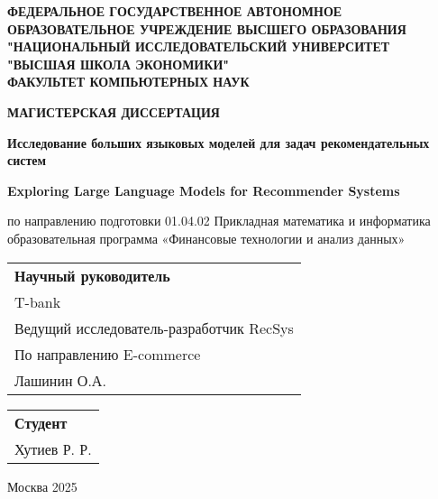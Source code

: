 \documentclass[12pt,a4paper]{extreport}
\begin{document}
\pagestyle{empty}

\begin{center}
\textbf{ФЕДЕРАЛЬНОЕ ГОСУДАРСТВЕННОЕ АВТОНОМНОЕ ОБРАЗОВАТЕЛЬНОЕ УЧРЕЖДЕНИЕ ВЫСШЕГО ОБРАЗОВАНИЯ \\
"НАЦИОНАЛЬНЫЙ ИССЛЕДОВАТЕЛЬСКИЙ УНИВЕРСИТЕТ \\
"ВЫСШАЯ ШКОЛА ЭКОНОМИКИ" \\
ФАКУЛЬТЕТ КОМПЬЮТЕРНЫХ НАУК}

\vspace{2cm}

\textbf{МАГИСТЕРСКАЯ ДИССЕРТАЦИЯ}

\vspace{1.5cm}

\begin{doublespace}
\textbf{	Исследование больших языковых моделей для задач рекомендательных систем} 
\end{doublespace}

\vspace{0.5cm}

\begin{doublespace}
\textbf{Exploring Large Language Models for Recommender Systems} \\
\end{doublespace}

\vspace{1cm}

по направлению подготовки 01.04.02 Прикладная математика и информатика \\
образовательная программа «Финансовые технологии и анализ данных»

\vspace{1cm}

\begin{flushright}
\begin{tabular}{l}
\textbf{Научный руководитель}\\
T-bank\\
Ведущий исследователь-разработчик RecSys \\
По направлению E-commerce\\
Лашинин О.А.\\ \hline
\end{tabular}
\end{flushright}

\vspace{1cm}

\begin{flushright}
\begin{tabular}{l}
\textbf{Студент} \\
Хутиев Р. Р. \qquad \qquad \qquad \\ \hline
\end{tabular}
\end{flushright}


Москва 2025

\end{center}
\end{document}
